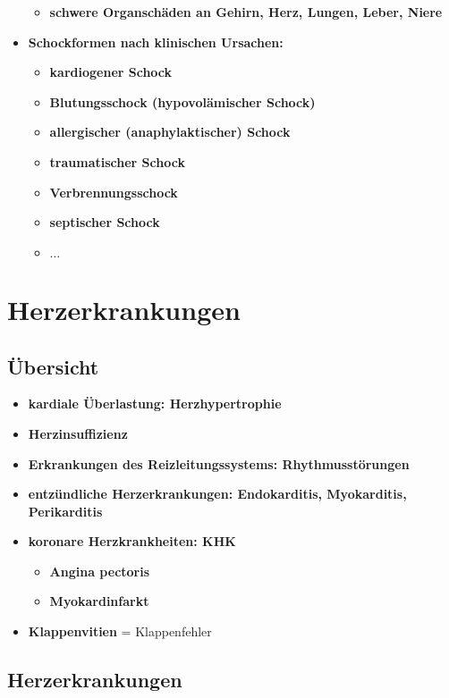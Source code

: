 \begin{itemize}
				\begin{itemize}
					\item \textbf{schwere Organschäden an Gehirn, Herz, Lungen, Leber, Niere}
				\end{itemize}
			\item \textbf{Schockformen nach klinischen Ursachen:}
				\begin{itemize}
					\item \textbf{kardiogener Schock}
					\item \textbf{Blutungsschock (hypovolämischer Schock)}
					\item \textbf{allergischer (anaphylaktischer) Schock}
					\item \textbf{traumatischer Schock}
					\item \textbf{Verbrennungsschock}
					\item \textbf{septischer Schock}
					\item \textbf{$\dots$}
				\end{itemize}
		\end{itemize}
		
\section{Herzerkrankungen}
	\subsection{Übersicht}
		\begin{itemize}
			\item \textbf{kardiale Überlastung: Herzhypertrophie}
			\item \textbf{Herzinsuffizienz}
			\item \textbf{Erkrankungen des Reizleitungssystems: Rhythmusstörungen}
			\item \textbf{entzündliche Herzerkrankungen: Endokarditis, Myokarditis, Perikarditis}
			\item \textbf{koronare Herzkrankheiten: KHK}
				\begin{itemize}
					\item \textbf{Angina pectoris}
					\item \textbf{Myokardinfarkt}
				\end{itemize}
			\item \textbf{Klappenvitien} = Klappenfehler
		\end{itemize}
	\subsection{Herzerkrankungen}

